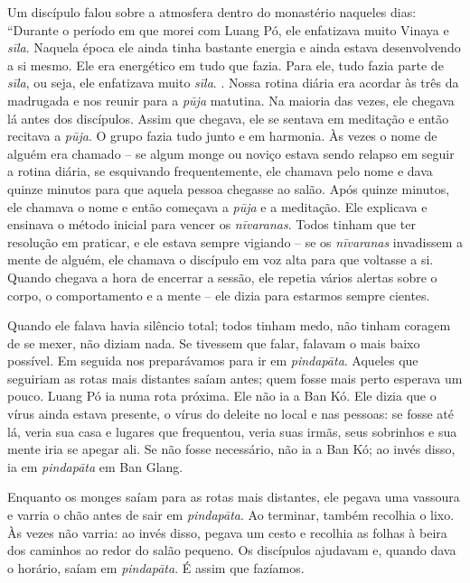 Um discípulo falou sobre a atmosfera dentro do monastério naqueles dias:
``Durante o período em que morei com Luang Pó, ele enfatizava muito
Vinaya e \emph{sīla}. Naquela época ele ainda tinha bastante energia e
ainda estava desenvolvendo a si mesmo. Ele era energético em tudo que
fazia. Para ele, tudo fazia parte de \emph{sīla}, ou seja, ele
enfatizava muito \emph{sīla}.
.
Nossa rotina diária era acordar às três da madrugada e nos reunir para a
\emph{pūja} matutina. Na maioria das vezes, ele chegava lá antes dos
discípulos. Assim que chegava, ele se sentava em meditação e então
recitava a \emph{pūja}. O grupo fazia tudo junto e em harmonia. Às vezes
o nome de alguém era chamado -- se algum monge ou noviço estava sendo
relapso em seguir a rotina diária, se esquivando frequentemente, ele
chamava pelo nome e dava quinze minutos para que aquela pessoa chegasse
ao salão. Após quinze minutos, ele chamava o nome e então começava a
\emph{pūja} e a meditação. Ele explicava e ensinava o método inicial
para vencer os \emph{nīvaranas}. Todos tinham que ter resolução em
praticar, e ele estava sempre vigiando -- se os \emph{nīvaranas}
invadissem a mente de alguém, ele chamava o discípulo em voz alta para
que voltasse a si. Quando chegava a hora de encerrar a sessão, ele
repetia vários alertas sobre o corpo, o comportamento e a mente -- ele
dizia para estarmos sempre cientes.

Quando ele falava havia silêncio total; todos tinham medo, não tinham
coragem de se mexer, não diziam nada. Se tivessem que falar, falavam o
mais baixo possível. Em seguida nos preparávamos para ir em
\emph{pindapāta}. Aqueles que seguiriam as rotas mais distantes saíam
antes; quem fosse mais perto esperava um pouco. Luang Pó ia numa rota
próxima. Ele não ia a Ban Kó. Ele dizia que o vírus ainda estava
presente, o vírus do deleite no local e nas pessoas: se fosse até lá,
veria sua casa e lugares que frequentou, veria suas irmãs, seus
sobrinhos e sua mente iria se apegar ali. Se não fosse necessário, não
ia a Ban Kó; ao invés disso, ia em \emph{pindapāta} em Ban Glang.

Enquanto os monges saíam para as rotas mais distantes, ele pegava uma
vassoura e varria o chão antes de sair em \emph{pindapāta}. Ao terminar,
também recolhia o lixo. Às vezes não varria: ao invés disso, pegava um
cesto e recolhia as folhas à beira dos caminhos ao redor do salão
pequeno. Os discípulos ajudavam e, quando dava o horário, saíam em
\emph{pindapāta}. É assim que fazíamos.

